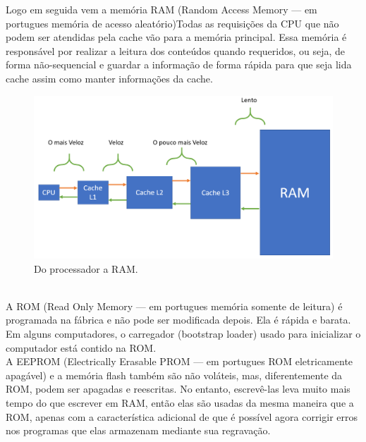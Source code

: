 Logo em seguida vem a memória RAM (Random Access Memory — em portugues memória de acesso aleatório)Todas as requisições da CPU que não podem ser atendidas pela cache vão para a memória principal. Essa memória é responsável por realizar a leitura dos conteúdos quando requeridos, ou seja, de forma não-sequencial e guardar a informação de forma rápida para que seja lida cache assim como manter informações da cache.
\begin{figure}[htpb]
    \centering
   \includegraphics[scale=0.25]{imagens/velocidaderam.png}
   \caption{Do processador a RAM.}
   \label{fig:velocidade}
\end{figure}\\

A ROM (Read Only Memory — em portugues memória somente de leitura) é programada na fábrica e não pode ser modificada depois. Ela é rápida e barata. Em alguns computadores, o carregador (bootstrap loader) usado para inicializar o computador está contido na ROM.\\
A EEPROM (Electrically Erasable PROM — em portugues ROM eletricamente apagável) e a memória flash também são não voláteis, mas, diferentemente da ROM, podem ser apagadas e reescritas. No entanto, escrevê-las leva muito mais tempo do que escrever em RAM,
então elas são usadas da mesma maneira que a ROM, apenas com a característica adicional de que é possível agora corrigir erros nos programas que elas armazenam mediante sua regravação. 